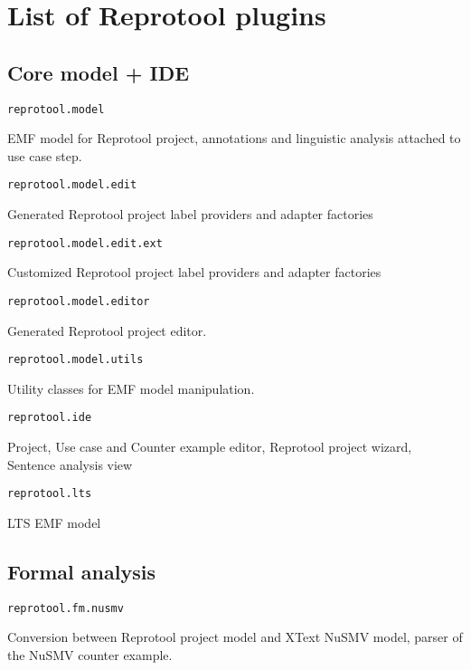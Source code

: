 \section{List of Reprotool plugins}
\label{sec:plugins}

\subsection{Core model + IDE}

\begin{verbatim}
reprotool.model
\end{verbatim}
EMF model for Reprotool project, annotations and linguistic analysis attached to use case step.

\begin{verbatim}
reprotool.model.edit
\end{verbatim}
Generated Reprotool project label providers and adapter factories

\begin{verbatim}
reprotool.model.edit.ext
\end{verbatim}
Customized Reprotool project label providers and adapter factories

\begin{verbatim}
reprotool.model.editor
\end{verbatim}
Generated Reprotool project editor.

\begin{verbatim}
reprotool.model.utils
\end{verbatim}
Utility classes for EMF model manipulation.

\begin{verbatim}
reprotool.ide
\end{verbatim}
Project, Use case and Counter example editor, Reprotool project wizard, Sentence analysis view

\begin{verbatim}
reprotool.lts
\end{verbatim}
LTS EMF model

\subsection{Formal analysis}

\begin{verbatim}
reprotool.fm.nusmv
\end{verbatim}
Conversion between Reprotool project model and XText NuSMV model, parser of the
NuSMV counter example.

